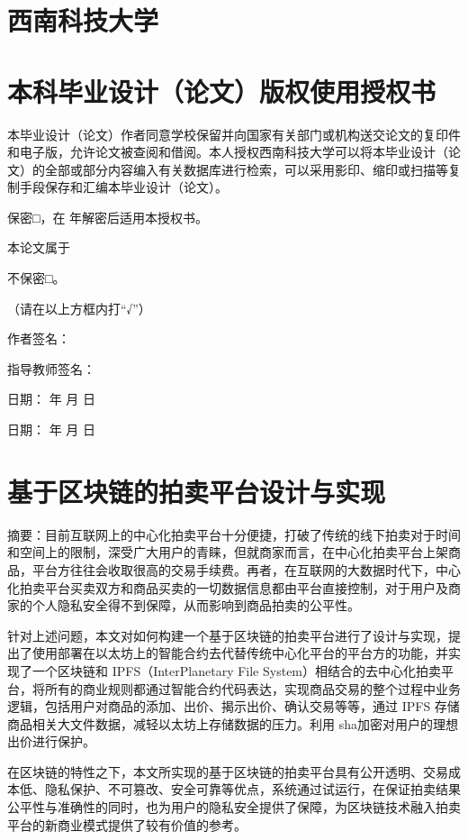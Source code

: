 \documentclass[
  10
]{article}
\begin{document}
\section{西南科技大学}\label{ux897fux5357ux79d1ux6280ux5927ux5b66-2}

\section{本科毕业设计（论文）版权使用授权书}\label{ux672cux79d1ux6bd5ux4e1aux8bbeux8ba1ux8bbaux6587ux7248ux6743ux4f7fux7528ux6388ux6743ux4e66}

本毕业设计（论文）作者同意学校保留并向国家有关部门或机构送交论文的复印件和电子版，允许论文被查阅和借阅。本人授权西南科技大学可以将本毕业设计（论文）的全部或部分内容编入有关数据库进行检索，可以采用影印、缩印或扫描等复制手段保存和汇编本毕业设计（论文）。

保密□，在 年解密后适用本授权书。

本论文属于

不保密□。

（请在以上方框内打``√''）

作者签名：

指导教师签名：

日期： 年 月 日

日期： 年 月 日

\section{基于区块链的拍卖平台设计与实现}\label{ux57faux4e8eux533aux5757ux94feux7684ux62cdux5356ux5e73ux53f0ux8bbeux8ba1ux4e0eux5b9eux73b0}

摘要：目前互联网上的中心化拍卖平台十分便捷，打破了传统的线下拍卖对于时间和空间上的限制，深受广大用户的青睐，但就商家而言，在中心化拍卖平台上架商品，平台方往往会收取很高的交易手续费。再者，在互联网的大数据时代下，中心化拍卖平台买卖双方和商品买卖的一切数据信息都由平台直接控制，对于用户及商家的个人隐私安全得不到保障，从而影响到商品拍卖的公平性。

针对上述问题，本文对如何构建一个基于区块链的拍卖平台进行了设计与实现，提出了使用部署在以太坊上的智能合约去代替传统中心化平台的平台方的功能，并实现了一个区块链和
IPFS（InterPlanetary File
System）相结合的去中心化拍卖平台，将所有的商业规则都通过智能合约代码表达，实现商品交易的整个过程中业务逻辑，包括用户对商品的添加、出价、揭示出价、确认交易等等，通过
IPFS 存储商品相关大文件数据，减轻以太坊上存储数据的压力。利用
sha加密对用户的理想出价进行保护。

在区块链的特性之下，本文所实现的基于区块链的拍卖平台具有公开透明、交易成本低、隐私保护、不可篡改、安全可靠等优点，系统通过试运行，在保证拍卖结果公平性与准确性的同时，也为用户的隐私安全提供了保障，为区块链技术融入拍卖平台的新商业模式提供了较有价值的参考。
\end{document}
